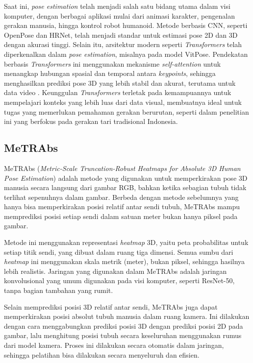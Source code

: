Saat ini, \textit{pose estimation} telah menjadi salah satu bidang utama dalam visi komputer, dengan berbagai aplikasi mulai dari animasi karakter, pengenalan gerakan manusia, hingga kontrol robot humanoid. Metode berbasis CNN, seperti OpenPose dan HRNet, telah menjadi standar untuk estimasi pose 2D dan 3D dengan akurasi tinggi. Selain itu, arsitektur modern seperti \textit{Transformers} telah diperkenalkan dalam \textit{pose estimation}, misalnya pada model VitPose. Pendekatan berbasis \textit{Transformers} ini menggunakan mekanisme \textit{self-attention} untuk menangkap hubungan spasial dan temporal antara \textit{keypoints}, sehingga menghasilkan prediksi pose 3D yang lebih stabil dan akurat, terutama untuk data video . Keunggulan \textit{Transformers} terletak pada kemampuannya untuk mempelajari konteks yang lebih luas dari data visual, membuatnya ideal untuk tugas yang memerlukan pemahaman gerakan berurutan, seperti dalam penelitian ini yang berfokus pada gerakan tari tradisional Indonesia.

\subsection{MeTRAbs}
MeTRAbs (\textit{Metric-Scale Truncation-Robust Heatmaps for Absolute 3D Human Pose Estimation}) adalah metode yang digunakan untuk memperkirakan pose 3D manusia secara langsung dari gambar RGB, bahkan ketika sebagian tubuh tidak terlihat sepenuhnya dalam gambar. Berbeda dengan metode sebelumnya yang hanya bisa memperkirakan posisi relatif antar sendi tubuh, MeTRAbs mampu memprediksi posisi setiap sendi dalam satuan meter bukan hanya piksel pada gambar.

Metode ini menggunakan representasi \textit{heatmap} 3D, yaitu peta probabilitas untuk setiap titik sendi, yang dibuat dalam ruang tiga dimensi. Semua sumbu dari \textit{heatmap} ini menggunakan skala metrik (meter), bukan piksel, sehingga hasilnya lebih realistis. Jaringan yang digunakan dalam MeTRAbs adalah jaringan konvolusional yang umum digunakan pada visi komputer, seperti ResNet-50, tanpa bagian tambahan yang rumit.

Selain memprediksi posisi 3D relatif antar sendi, MeTRAbs juga dapat memperkirakan posisi absolut tubuh manusia dalam ruang kamera. Ini dilakukan dengan cara menggabungkan prediksi posisi 3D dengan prediksi posisi 2D pada gambar, lalu menghitung posisi tubuh secara keseluruhan menggunakan rumus dari model kamera. Proses ini dilakukan secara otomatis dalam jaringan, sehingga pelatihan bisa dilakukan secara menyeluruh dan efisien.


